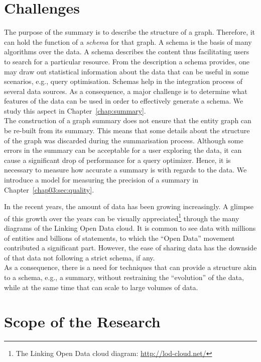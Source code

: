 \section{Challenges}

The purpose of the summary is to describe the structure of a graph. Therefore, it can hold the function of a \emph{schema} for that graph.
A schema is the basis of many algorithms over the data. A schema describes the content thus facilitating users to search for a particular resource. From the description a schema provides, one may draw out statistical information about the data that can be useful in some scenarios, e.g., query optimisation. Schemas help in the integration process of several data sources. As a consequence, a major challenge is to determine what features of the data can be used in order to effectively generate a schema. We study this aspect in Chapter~\ref{chap:summary}.\\

The construction of a graph summary does not ensure that the entity graph can be re-built from its summary. This means that some details about the structure of the graph was discarded during the summarisation process. Although some errors in the summary can be acceptable for a user exploring the data, it can cause a significant drop of performance for a query optimizer. Hence, it is necessary to measure how accurate a summary is with regards to the data. We introduce a model for measuring the precision of a summary in Chapter~\ref{chap03:sec:quality}.

In the recent years, the amount of data has been growing increasingly. A glimpse of this growth over the years can be visually appreciated\footnote{The Linking Open Data cloud diagram: \url{http://lod-cloud.net/}} through the many diagrams of the Linking Open Data cloud. It is common to see data with millions of entities and billions of statements, to which the ``Open Data'' movement contributed a significant part. However, the ease of sharing data has the downside of that data not following a strict schema, if any.\\

As a consequence, there is a need for techniques that can provide a structure akin to a schema, e.g., a summary, without restraining the ``evolution'' of the data, while at the same time that can scale to large volumes of data.

\section{Scope of the Research}

